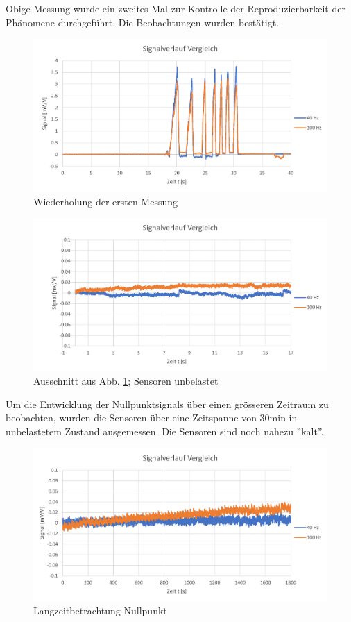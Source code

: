 \documentclass[12pt,a4paper]{article}
\begin{document}
Obige Messung wurde ein zweites Mal zur Kontrolle der Reproduzierbarkeit der Phänomene durchgeführt. Die Beobachtungen wurden bestätigt.
\begin{figure}[H]
	\centering
	\includegraphics[width=1\linewidth]{imgs/daten_002}
	\caption{Wiederholung der ersten Messung}
	\label{fig:daten002}
\end{figure}
\begin{figure}[H]
	\centering
	\includegraphics[width=1\linewidth]{imgs/daten_002_NP}
	\caption{Ausschnitt aus Abb. \ref{fig:daten002}; Sensoren unbelastet}
	\label{fig:daten002_NP}
\end{figure}\noindent
Um die Entwicklung der Nullpunktsignals über einen grösseren Zeitraum zu beobachten, wurden die Sensoren über eine Zeitspanne von 30min in unbelastetem Zustand ausgemessen. Die Sensoren sind noch nahezu ''kalt''.
\begin{figure}[H]
	\centering
	\includegraphics[width=1\linewidth]{imgs/daten_003_kpl}
	\caption{Langzeitbetrachtung Nullpunkt}
	\label{fig:daten003kpl}
\end{figure}
\end{document}
